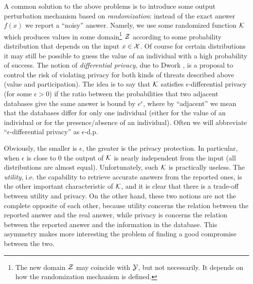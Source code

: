 \documentclass{llncs}
\begin{document}
A common solution to the above problems is to introduce some output perturbation mechanism based on \emph{randomization}: instead of the exact answer $f(x)$ we report a ``noisy'' answer. Namely, we use some  randomized function ${\cal K}$ which produces values in some domain\footnote{The new domain $\cal Z$ may coincide with $\cal Y$, but not necessarily. It depends on how the randomization mechanism is defined.}  ${\cal Z}$
according to some probability distribution that depends on the input $x\in {\cal X}$. Of course for certain distributions it may still be possible to guess the value of an individual with a high probability of success. 
The notion of \emph{differential privacy}, due to  Dwork \cite{Dwork:06:ICALP,Dwork:09:STOC,Dwork:10:SODA,Dwork:11:CACM}, is a proposal to control  the risk of violating privacy for both kinds of threats described above (value and participation).  
The idea is to say  that $\cal K$ satisfies $\epsilon$-differential privacy  (for some $\epsilon>0$) if the ratio between the probabilities that two adjacent databases give the same answer is bound by $e^\epsilon$, where by ``adjacent'' we mean that the  databases differ for only one individual 
(either for the value of an individual or for the presence/absence of an individual). Often we will abbreviate ``$\epsilon$-differential privacy'' as $\epsilon$-d.p.

Obviously, the smaller is $\epsilon$,  the greater is the privacy protection. In particular, when $\epsilon$ is close to $0$ the output of $\cal K$ is nearly independent from the input (all distributions are almost equal). Unfortunately, such $\cal K$ is practically useless. 
The \emph{utility}, i.e. the capability to retrieve accurate answers from the reported ones, is the other important characteristic of $\cal K$, and it is clear that there is a trade-off between utility and privacy. On the other hand, these two notions are not the complete opposite of each other, because utility concerns the relation between the reported answer and the real answer, while privacy is concerns the relation between the reported answer and the information in the database. This asymmetry makes more interesting the problem of finding a good compromise between the two. 
\end{document}
